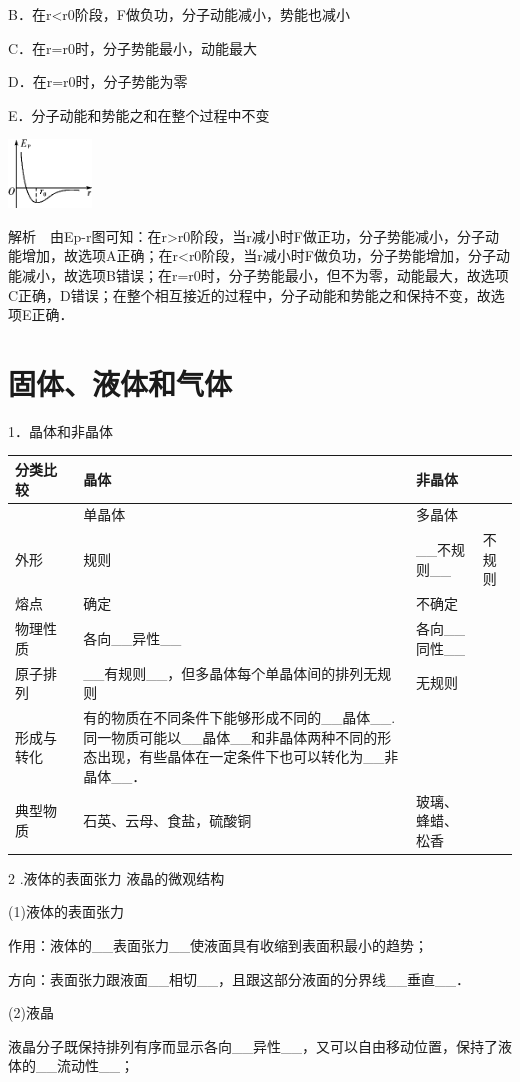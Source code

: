B．在r\textless r0阶段，F做负功，分子动能减小，势能也减小

C．在r=r0时，分子势能最小，动能最大

D．在r=r0时，分子势能为零

E．分子动能和势能之和在整个过程中不变

\begin{center}\includegraphics[width=0.87708in,height=0.71667in]{media/image489.png}\end{center}
解析　由Ep-r图可知：在r\textgreater r0阶段，当r减小时F做正功，分子势能减小，分子动能增加，故选项A正确；在r\textless r0阶段，当r减小时F做负功，分子势能增加，分子动能减小，故选项B错误；在r=r0时，分子势能最小，但不为零，动能最大，故选项C正确，D错误；在整个相互接近的过程中，分子动能和势能之和保持不变，故选项E正确．

\section{固体、液体和气体}

1．晶体和非晶体

\begin{longtable}[]{@{}llll@{}}
\toprule
分类比较　　 & 晶体 & 非晶体 &\tabularnewline
\midrule
\endhead
& 单晶体 & 多晶体 &\tabularnewline
外形 & 规则 & \_\_不规则\_\_ & 不规则\tabularnewline
熔点 & 确定 & 不确定 &\tabularnewline
物理性质 & 各向\_\_异性\_\_ & 各向\_\_同性\_\_ &\tabularnewline
原子排列 & \_\_有规则\_\_，但多晶体每个单晶体间的排列无规则 & 无规则
&\tabularnewline
形成与转化 &
有的物质在不同条件下能够形成不同的\_\_晶体\_\_.同一物质可能以\_\_晶体\_\_和非晶体两种不同的形态出现，有些晶体在一定条件下也可以转化为\_\_非晶体\_\_．
& &\tabularnewline
典型物质 & 石英、云母、食盐，硫酸铜 & 玻璃、蜂蜡、松香 &\tabularnewline
\bottomrule
\end{longtable}

2 .液体的表面张力 液晶的微观结构

(1)液体的表面张力

作用：液体的\_\_表面张力\_\_使液面具有收缩到表面积最小的趋势；

方向：表面张力跟液面\_\_相切\_\_，且跟这部分液面的分界线\_\_垂直\_\_．

(2)液晶

液晶分子既保持排列有序而显示各向\_\_异性\_\_，又可以自由移动位置，保持了液体的\_\_流动性\_\_；

